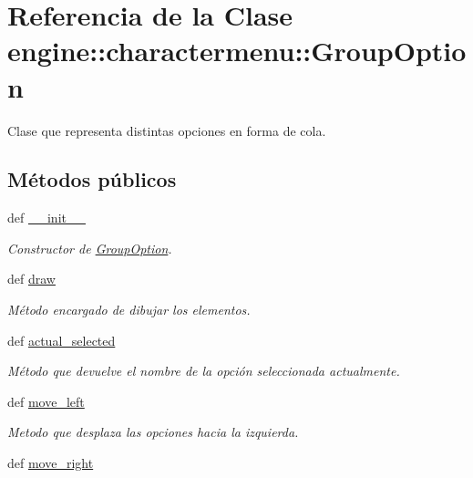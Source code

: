 \hypertarget{classengine_1_1charactermenu_1_1GroupOption}{
\section{\-Referencia de la \-Clase engine\-:\-:charactermenu\-:\-:\-Group\-Option}
\label{classengine_1_1charactermenu_1_1GroupOption}
}


\-Clase que representa distintas opciones en forma de cola.  


\subsection*{\-Métodos públicos}
\begin{DoxyCompactItemize}
\item 
def \hyperlink{classengine_1_1charactermenu_1_1GroupOption_ab5fb269698126935f5cc1a5b2c0c9f7e}{\-\_\-\-\_\-init\-\_\-\-\_\-}
\begin{DoxyCompactList}\small\item\em \-Constructor de \hyperlink{classengine_1_1charactermenu_1_1GroupOption}{\-Group\-Option}. \end{DoxyCompactList}\item 
def \hyperlink{classengine_1_1charactermenu_1_1GroupOption_ae46a3d4423d13298197b77bbd77e09bc}{draw}
\begin{DoxyCompactList}\small\item\em \-Método encargado de dibujar los elementos. \end{DoxyCompactList}\item 
def \hyperlink{classengine_1_1charactermenu_1_1GroupOption_af1247efa798ae63ec0b3fdc01f768f72}{actual\-\_\-selected}
\begin{DoxyCompactList}\small\item\em \-Método que devuelve el nombre de la opción seleccionada actualmente. \end{DoxyCompactList}\item 
\hypertarget{classengine_1_1charactermenu_1_1GroupOption_a0502bd978608bbf5fefa92831aa6a5a6}{
def \hyperlink{classengine_1_1charactermenu_1_1GroupOption_a0502bd978608bbf5fefa92831aa6a5a6}{move\-\_\-left}}
\label{classengine_1_1charactermenu_1_1GroupOption_a0502bd978608bbf5fefa92831aa6a5a6}

\begin{DoxyCompactList}\small\item\em \-Metodo que desplaza las opciones hacia la izquierda. \end{DoxyCompactList}\item 
\hypertarget{classengine_1_1charactermenu_1_1GroupOption_ab0e5e91223597e8675a4b59ffa4294a0}{
def \hyperlink{classengine_1_1charactermenu_1_1GroupOption_ab0e5e91223597e8675a4b59ffa4294a0}{move\-\_\-right}}
\label{classengine_1_1charactermenu_1_1GroupOption_ab0e5e91223597e8675a4b59ffa4294a0}


\end{DoxyCompactItemize}
